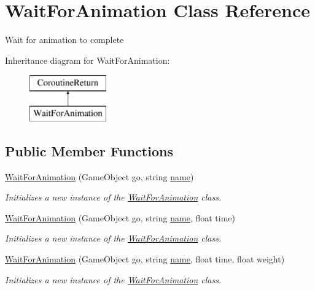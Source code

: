 \hypertarget{class_wait_for_animation}{}\section{Wait\+For\+Animation Class Reference}
\label{class_wait_for_animation}


Wait for animation to complete  


Inheritance diagram for Wait\+For\+Animation\+:\begin{figure}[H]
\begin{center}
\leavevmode
\includegraphics[height=2.000000cm]{class_wait_for_animation}
\end{center}
\end{figure}
\subsection*{Public Member Functions}
\begin{DoxyCompactItemize}
\item 
\hyperlink{class_wait_for_animation_a8a85909f01899724a26cd5451051039e}{Wait\+For\+Animation} (Game\+Object go, string \hyperlink{class_wait_for_animation_a2bd9db632988be8570fb739741d80222}{name})
\begin{DoxyCompactList}\small\item\em Initializes a new instance of the \hyperlink{class_wait_for_animation}{Wait\+For\+Animation} class. \end{DoxyCompactList}\item 
\hyperlink{class_wait_for_animation_a29e836a6688ce19b2a540619afeffca6}{Wait\+For\+Animation} (Game\+Object go, string \hyperlink{class_wait_for_animation_a2bd9db632988be8570fb739741d80222}{name}, float time)
\begin{DoxyCompactList}\small\item\em Initializes a new instance of the \hyperlink{class_wait_for_animation}{Wait\+For\+Animation} class. \end{DoxyCompactList}\item 
\hyperlink{class_wait_for_animation_a04692036277b56d5a182e65a399facd9}{Wait\+For\+Animation} (Game\+Object go, string \hyperlink{class_wait_for_animation_a2bd9db632988be8570fb739741d80222}{name}, float time, float weight)
\begin{DoxyCompactList}\small\item\em Initializes a new instance of the \hyperlink{class_wait_for_animation}{Wait\+For\+Animation} class. \end{DoxyCompactList}\end{DoxyCompactItemize}
